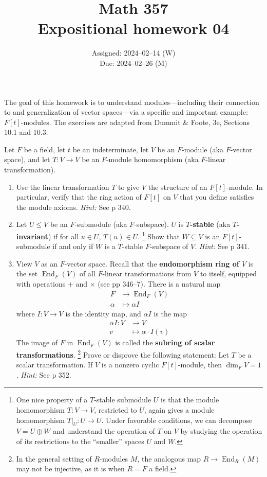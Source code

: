 \documentclass[oneside, english, 11pt]{article}
\title{Math 357\\Expositional homework 04}
\author{}
\date{Assigned: 2024--02--14 (W)\\\hspace{9.3mm}Due: 2024--02--26 (M)}
\newcommand{\fontDefWord}[1]{\textbf{#1}}
\newcommand{\fontHint}[1]{\emph{Hint:} #1}
\DeclareMathOperator{\Endomorphism}{End}
\newcommand{\submodule}{\leq}
\begin{document}
\maketitle

The goal of this homework is to understand modules---including their connection to and generalization of vector spaces---via a specific and important example: $F[t]$-modules. The exercises are adapted from Dummit \&{} Foote, 3e, Sections 10.1 and 10.3.

Let $F$ be a field, let $t$ be an indeterminate, let $V$ be an $F$-module (aka $F$-vector space), and let $T : V \rightarrow V$ be an $F$-module homomorphism (aka $F$-linear transformation).

\begin{enumerate}[label=(\alph*)]
\item\label{itm : EH04a} Use the linear transformation $T$ to give $V$ the structure of an $F[t]$-module. In particular, verify that the ring action of $F[t]$ on $V$ that you define satisfies the module axioms. \fontHint{See p 340.}

\item\label{itm : EH04b} Let $U \submodule V$ be an $F$-submodule (aka $F$-subspace). $U$ is \fontDefWord{$T$-stable} (aka \fontDefWord{$T$-invariant}) if for all $u \in U$, $T(u) \in U$.%
\footnote{One nice property of a $T$-stable submodule $U$ is that the module homomorphism $T : V \rightarrow V$, restricted to $U$, again gives a module homomorphism $T|_{U} : U \rightarrow U$. Under favorable conditions, we can decompose $V = U \oplus W$ and understand the operation of $T$ on $V$ by studying the operation of its restrictions to the ``smaller'' spaces $U$ and $W$.} %
Show that $W \subseteq V$ is an $F[t]$-submodule if and only if $W$ is a $T$-stable $F$-subspace of $V$. \fontHint{See p 341.}

\item\label{itm : EH04c} View $V$ as an $F$-vector space. Recall that the \fontDefWord{endomorphism ring of $V$} is the set $\Endomorphism_{F}(V)$ of all $F$-linear transformations from $V$ to itself, equipped with operations $+$ and $\times$ (see pp 346--7). There is a natural map
\begin{align*}
F &\rightarrow \Endomorphism_{F}(V)
\\
\alpha &\mapsto \alpha I
\end{align*}
where $I : V \rightarrow V$ is the identity map, and $\alpha I$ is the map
\begin{align*}
\alpha I : V &\rightarrow V
\\
v &\mapsto \alpha \cdot I(v)
\end{align*}
The image of $F$ in $\Endomorphism_{F}(V)$ is called the \fontDefWord{subring of scalar transformations}.%
\footnote{In the general setting of $R$-modules $M$, the analogous map $R \rightarrow \Endomorphism_{R}(M)$ may not be injective, as it is when $R = F$ a field.} %
Prove or disprove the following statement: Let $T$ be a scalar transformation. If $V$ is a nonzero cyclic $F[t]$-module, then $\dim_{F} V = 1$. \fontHint{See p 352.}


\end{enumerate}
\end{document}
